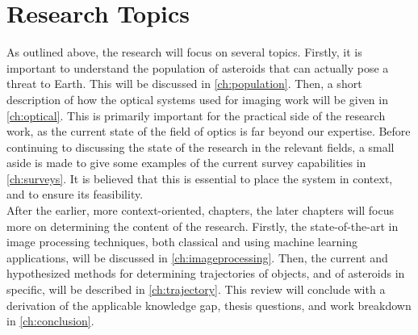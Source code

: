 \section{Research Topics}
As outlined above, the research will focus on several topics. Firstly, it is important to understand the population of asteroids that can actually pose a threat to Earth. This will be discussed in \autoref{ch:population}. Then, a short description of how the optical systems used for imaging work will be given in \autoref{ch:optical}. This is primarily important for the practical side of the research work, as the current state of the field of optics is far beyond our expertise. Before continuing to discussing the state of the research in the relevant fields, a small aside is made to give some examples of the current survey capabilities in \autoref{ch:surveys}. It is believed that this is essential to place the system in context, and to ensure its feasibility. \\

After the earlier, more context-oriented, chapters, the later chapters will focus more on determining the content of the research. Firstly, the state-of-the-art in image processing techniques, both classical and using machine learning applications, will be discussed in \autoref{ch:imageprocessing}. Then, the current and hypothesized methods for determining trajectories of objects, and of asteroids in specific, will be described in \autoref{ch:trajectory}. This review will conclude with a derivation of the applicable knowledge gap, thesis questions, and work breakdown in \autoref{ch:conclusion}.